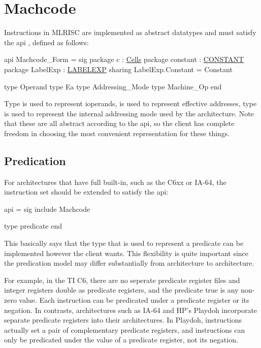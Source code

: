 \section{Machcode}

  Instructions in MLRISC are implemented as abstract datatypes and
must satisfy the api 
, defined as follows:

\begin{SML}
api Machcode_Form =
sig
   package c        : \href{cells.html}{Cells}
   package constant : \href{constants.html}{CONSTANT}
   package LabelExp : \href{labelexp.html}{LABELEXP}
      sharing LabelExp.Constant = Constant

   type Operand
   type Ea
   type Addressing_Mode
   type Machine_Op
end
\end{SML}

Type  is used to represent ioperands,
 is used to represent effective addresses, type 
 is used to represent the internal addressing mode
used by the architecture.  Note that these are all abstract according to 
the api, so the client has complete freedom in choosing the most
convenient representation for these things.

\subsection{Predication}
   For architectures that have full 
built-in, such as the C6xx or IA-64, the instruction set should be
extended to satisfy the api: 
\begin{SML}
api  =
sig
   include Machcode
   
   type predicate  
end
\end{SML}
This basically says that the type that is used to represent a predicate
can be implemented however the client wants.  This flexibility
is quite important since the predication model may differ substantially
from architecture to architecture.

For example, in the TI C6, there are no seperate predicate register files
and integer registers double as predicate registers, and the predicate
true is any non-zero value.  Each instruction can be predicated under a
predicate register or its negation.  In contrasts, architectures such as
IA-64 and HP's Playdoh incorporate separate predicate registers into their 
architectures.  In Playdoh,  instructions 
actually set a pair of complementary predicate registers, 
and instructions can only
be predicated under the value of a predicate register, not its negation.

